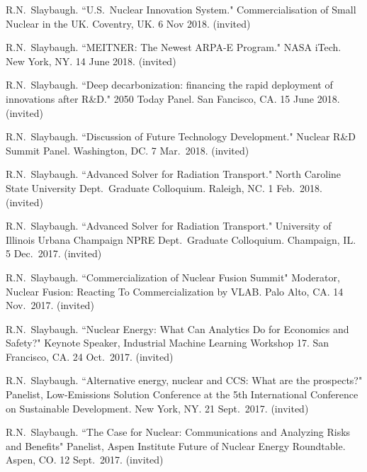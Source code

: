 \begin{bibsection}
\item R.N.\ Slaybaugh.  ``U.S.\ Nuclear Innovation System." Commercialisation of Small Nuclear in the UK. Coventry, UK. 6 Nov 2018. (invited)

\item R.N.\ Slaybaugh.  ``MEITNER: The Newest ARPA-E Program." NASA iTech. New York, NY. 14 June 2018. (invited)

\item R.N.\ Slaybaugh.  ``Deep decarbonization: financing the rapid deployment of innovations after R\&D." 2050 Today Panel. San Fancisco, CA. 15 June 2018. (invited)

\item R.N.\ Slaybaugh. ``Discussion of Future Technology Development." Nuclear R\&D Summit Panel. Washington, DC. 7 Mar.\ 2018. (invited)

\item R.N.\ Slaybaugh.  ``Advanced Solver for Radiation Transport." North Caroline State University Dept.\ Graduate Colloquium. Raleigh, NC. 1 Feb.\ 2018. (invited)


\item R.N.\ Slaybaugh.  ``Advanced Solver for Radiation Transport." University of Illinois Urbana Champaign NPRE Dept.\ Graduate Colloquium. Champaign, IL. 5 Dec.\ 2017. (invited)

\item R.N.\ Slaybaugh. ``Commercialization of  Nuclear Fusion Summit" Moderator, Nuclear Fusion: Reacting To Commercialization by VLAB. Palo Alto, CA. 14 Nov.\ 2017. (invited)

\item R.N.\ Slaybaugh. ``Nuclear Energy: What Can Analytics Do for Economics and Safety?" Keynote Speaker, Industrial Machine Learning Workshop 17. San Francisco, CA. 24 Oct.\ 2017. (invited)

\item R.N.\ Slaybaugh. ``Alternative energy, nuclear and CCS: What are the prospects?" Panelist, Low-Emissions Solution Conference at the 5th International Conference on Sustainable Development. New York, NY. 21  Sept.\ 2017. (invited)

\item R.N.\ Slaybaugh. ``The Case for Nuclear: Communications and Analyzing Risks and Benefits" Panelist, Aspen Institute Future of Nuclear Energy Roundtable. Aspen, CO. 12  Sept.\ 2017. (invited)


\end{bibsection}
